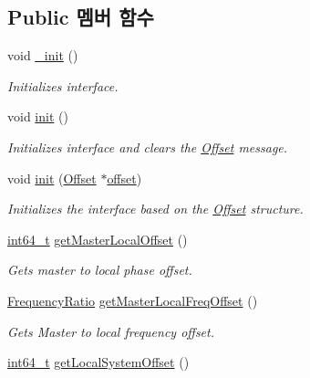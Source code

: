 \subsection*{Public 멤버 함수}
\begin{DoxyCompactItemize}
\item 
void \hyperlink{class_win_n_pipe_offset_update_message_a53578094a6e7647b6a9f9ea86975c4c2}{\+\_\+init} ()
\begin{DoxyCompactList}\small\item\em Initializes interface. \end{DoxyCompactList}\item 
void \hyperlink{class_win_n_pipe_offset_update_message_a02fd73d861ef2e4aabb38c0c9ff82947}{init} ()
\begin{DoxyCompactList}\small\item\em Initializes interface and clears the \hyperlink{class_offset}{Offset} message. \end{DoxyCompactList}\item 
void \hyperlink{class_win_n_pipe_offset_update_message_a10aa76c9729c853c004e8ab86b98a5f9}{init} (\hyperlink{class_offset}{Offset} $\ast$\hyperlink{class_win_n_pipe_offset_update_message_adc97734c3146947e87902755f386597d}{offset})
\begin{DoxyCompactList}\small\item\em Initializes the interface based on the \hyperlink{class_offset}{Offset} structure. \end{DoxyCompactList}\item 
\hyperlink{parse_8c_a67a9885ef4908cb72ce26d75b694386c}{int64\+\_\+t} \hyperlink{class_win_n_pipe_offset_update_message_abc42aafd6dffc7141dee491743476718}{get\+Master\+Local\+Offset} ()
\begin{DoxyCompactList}\small\item\em Gets master to local phase offset. \end{DoxyCompactList}\item 
\hyperlink{ptptypes_8hpp_a84de47dc2ed889ecd2b61706d3ad0f2e}{Frequency\+Ratio} \hyperlink{class_win_n_pipe_offset_update_message_ad014a34d775f3de042b7b75430c69669}{get\+Master\+Local\+Freq\+Offset} ()
\begin{DoxyCompactList}\small\item\em Gets Master to local frequency offset. \end{DoxyCompactList}\item 
\hyperlink{parse_8c_a67a9885ef4908cb72ce26d75b694386c}{int64\+\_\+t} \hyperlink{class_win_n_pipe_offset_update_message_ac0d8f13703d20f096163197fb0e2b165}{get\+Local\+System\+Offset} ()

\end{DoxyCompactItemize}

